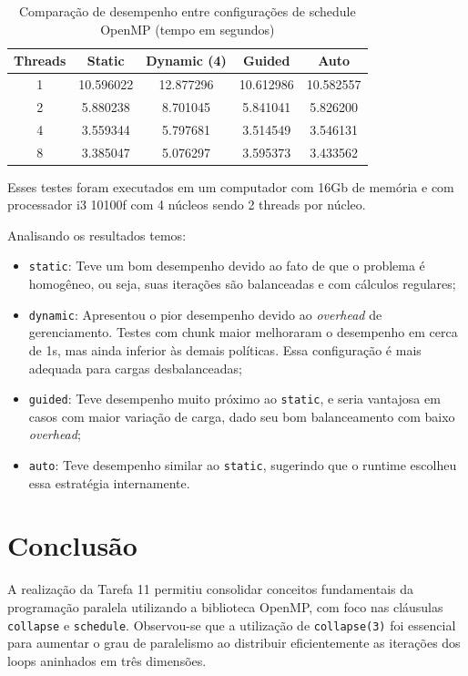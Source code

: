 \documentclass[a4paper, 12pt]{article}
\begin{document}
	\begin{table}[htbp]
		\centering
		\caption{Comparação de desempenho entre configurações de schedule OpenMP (tempo em segundos)}
		
		\vspace{1cm}
		\begin{tabular}{|c|c|c|c|c|}
			\hline
			\textbf{Threads} & \textbf{Static} & \textbf{Dynamic (4)} & \textbf{Guided} & \textbf{Auto} \\
			\hline
			1 & 10.596022 & 12.877296 & 10.612986 & 10.582557 \\
			\hline
			2 & 5.880238 & 8.701045 & 5.841041 & 5.826200 \\
			\hline
			4 & 3.559344 & 5.797681 & 3.514549 & 3.546131 \\
			\hline
			8 & 3.385047 & 5.076297 & 3.595373 & 3.433562 \\
			\hline
		\end{tabular}
		\label{tab:openmp_schedule_performance}
	\end{table}  
	
	Esses testes foram executados em um computador com 16Gb de memória e com processador i3 10100f com 4 núcleos sendo 2 threads por núcleo. 
	
	Analisando os resultados temos:
	
	\begin{itemize}  
		\item \texttt{static}: Teve um bom desempenho devido ao fato de que o problema é homogêneo, ou seja, suas iterações são balanceadas e com cálculos regulares;
		\item \texttt{dynamic}: Apresentou o pior desempenho devido ao \textit{overhead} de gerenciamento. Testes com chunk maior melhoraram o desempenho em cerca de 1s, mas ainda inferior às demais políticas. Essa configuração é mais adequada para cargas desbalanceadas;
		\item \texttt{guided}: Teve desempenho muito próximo ao \texttt{static}, e seria vantajosa em casos com maior variação de carga, dado seu bom balanceamento com baixo \textit{overhead};
		\item \texttt{auto}: Teve desempenho similar ao \texttt{static}, sugerindo que o runtime escolheu essa estratégia internamente.
	\end{itemize}  
	
	\section{Conclusão}  
	\hspace{.62cm}A realização da Tarefa 11 permitiu consolidar conceitos fundamentais da programação paralela utilizando a biblioteca OpenMP, com foco nas cláusulas \texttt{collapse} e \texttt{schedule}. Observou-se que a utilização de \texttt{collapse(3)} foi essencial para aumentar o grau de paralelismo ao distribuir eficientemente as iterações dos loops aninhados em três dimensões.  
	
\end{document}
